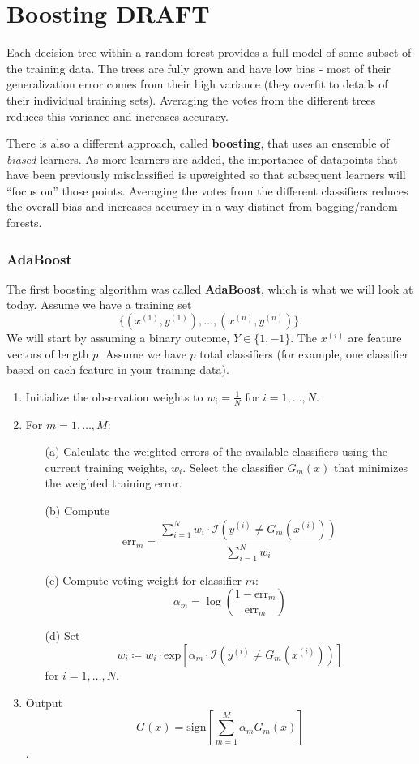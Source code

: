 \chapter{Boosting {\color{red} DRAFT} \label{chapter:boosting}}

Each decision tree within a random forest provides a full model of some subset of the training data. The trees are fully grown and have low bias - most of their generalization error comes from their high variance (they overfit to details of their individual training sets). Averaging the votes from the different trees reduces this variance and increases accuracy.

There is also a different approach, called \textbf{boosting}, that uses an ensemble of \emph{biased} learners. As more learners are added, the importance of datapoints that have been previously misclassified is upweighted so that subsequent learners will ``focus on'' those points. Averaging the votes from the different classifiers reduces the overall bias and increases accuracy in a way distinct from bagging/random forests. 

\subsection{AdaBoost}

The first boosting algorithm was called \textbf{AdaBoost}, which is what we will look at today. Assume we have a training set 
$$\{ (x^{(1)}, y^{(1)}),  \dots, (x^{(n)}, y^{(n)}) \}.$$ We will start by assuming a binary outcome, $Y \in \{1, -1\}$. The $x^{(i)}$ are feature vectors of length $p$. Assume we have $p$ total classifiers (for example, one classifier based on each feature in your training data).

\begin{enumerate}
\item Initialize the observation weights to $w_i = \frac{1}{N}$ for $i = 1, \dots, N$.
\item For $m = 1, \dots, M$:
    \begin{enumerate}
    \item[(a)] Calculate the weighted errors of the available classifiers using the current training weights, $w_i$. Select the classifier $G_m(x)$ that minimizes the weighted training error. 
    \item[(b)] Compute
    $$ \text{err}_m = \frac{\sum_{i=1}^N w_i \cdot \mathcal{I}(y^{(i)} \neq G_m (x^{(i)}))}{\sum_{i=1}^N w_i} $$
    \item[(c)] Compute voting weight for classifier $m$:
    $$ \alpha_m = \log \left( \frac{1 - \text{err}_m}{\text{err}_m} \right) $$
    \item[(d)] Set 
    $$ w_i \coloneqq w_i \cdot \text{exp} \left[ \alpha_m \cdot \mathcal{I}(y^{(i)} \neq G_m (x^{(i)})) \right] $$
    for $i = 1, \dots, N$. 
    \end{enumerate}
\item Output 
$$G(x) = \text{sign} \left[ \sum_{m=1}^M \alpha_m G_m(x) \right]$$. 
\end{enumerate}

